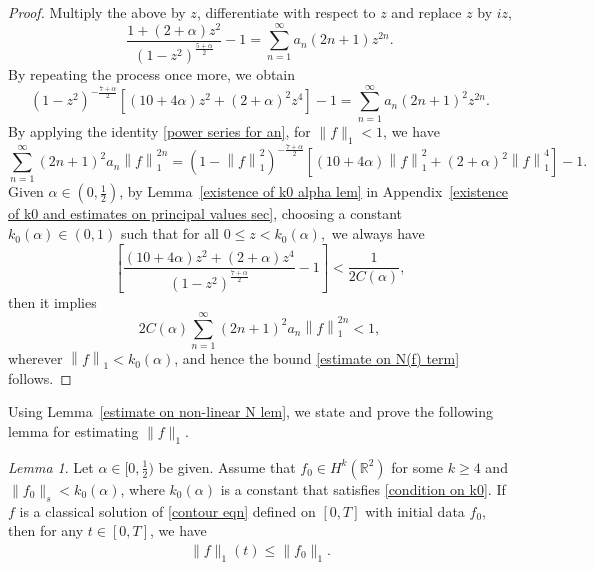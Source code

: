 \documentclass[reqno]{amsart}%
\theoremstyle{definition}
\theoremstyle{remark}
\numberwithin{equation}{section}
\newtheorem{lemma}[theorem]{Lemma}
\newcommand{\0}{\mathbf{0}}
\newcommand{\1}{\mathbf{1}}
\newcommand{\R}{\mathbb R}
\numberwithin{equation}{section}
\numberwithin{theorem}{section}
\numberwithin{figure}{section}
\begin{document}
{\begin{proof}
Multiply the above by $ z $, differentiate with respect to $z$ and replace $z$ by $iz$,
\begin{equation*}
\frac{1+(2+\alpha)z^2}{(1-z^2)^{\frac{5+\alpha}{2}}} -1= \sum_{n=1}^{\infty}    a_{n} (2n + 1)z^{2n}.
\end{equation*}
By repeating the process once more, we obtain
\begin{equation}\label{power series for an}
(1 - z^2)^{-\frac{7+\alpha}{2}} \left[ (10 + 4\alpha) z^2 + (2 + \alpha)^{2} z^{4} \right] - 1 = \sum_{n=1}^{\infty}  a_n (2n + 1)^{2} z^{2n}.
\end{equation}
By applying the identity \eqref{power series for an}, for $\|f\|_{1}<1$, we have
\begin{equation*}
\sum_{n=1}^{\infty}  (2n+1)^2 a_n \left\| f  \right\|_{1}^{2n} = \left( 1 - \left\| f  \right\|_{1}^{2} \right)^{-\frac{7+\alpha}{2}} \left[ (10 +4\alpha) \left\| f\right\|_{1}^2 + (2 + \alpha)^2 \left\| f \right\|_1^4 \right]-1.
\end{equation*}
Given $\alpha \in (0,\frac{1}{2})$, by Lemma~\ref{existence of k0 alpha lem} in Appendix~\ref{existence of k0 and estimates on principal values sec}, choosing a constant $k_0(\alpha) \in (0,1)$ such that for all $0 \leq z < k_{0}(\alpha),$ we always have
\begin{equation*}
\left[ \frac{(10 + 4 \alpha) z^2 + (2 + \alpha) z^4}{(1 - z^2)^{\frac{7 + \alpha}{2}}} -1\right] < \frac{1}{2C(\alpha)},
\end{equation*}
then it implies
\begin{equation*}
2C(\alpha) \sum_{n=1}^{\infty}  (2n+1)^2 a_n \left\|f \right\|_{1}^{2n} < 1,
\end{equation*}
wherever $\left\|f \right\|_{1} < k_0(\alpha)$, and hence the bound \eqref{estimate on N(f) term} follows.
\end{proof}

Using Lemma~\ref{estimate on non-linear N lem}, we state and prove the following lemma for estimating $\|f\|_{1}$.

\begin{lemma}\label{f1 estimate lemma}
Let $\alpha\in[0,\frac{1}{2})$ be given. Assume that $f_0\in H^k(\R^2)$ for some $k\ge4$ and $\|f_0\|_{s}<k_0(\alpha)$, where $k_0(\alpha)$ is a constant that satisfies \eqref{condition on k0}. If $f$ is a classical solution of \eqref{contour eqn} defined on $[0,T]$ with initial data $f_0$, then for any $t\in[0,T]$, we have
\begin{align}\label{bound on f in fourier norm}
\|f\|_{1}(t)\le\|f_0\|_{1}.
\end{align}
\end{lemma}

}
\end{document}
